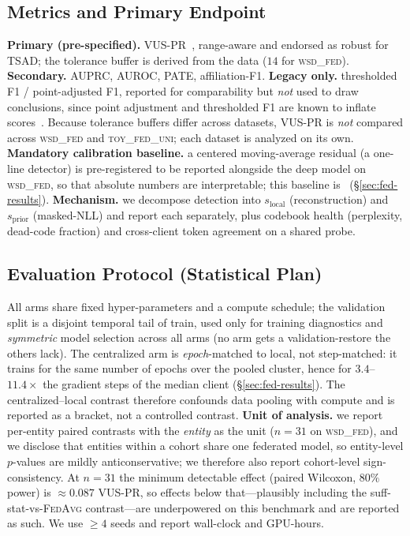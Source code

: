\subsection{Metrics and Primary Endpoint}
\label{sec:fed-metrics}
\textbf{Primary (pre-specified).} VUS-PR~\cite{boniol2022vus}, range-aware and endorsed as
robust for TSAD; the tolerance buffer is derived from the data ($14$ for \textsc{wsd\_fed}).
\textbf{Secondary.} AUPRC, AUROC, PATE, affiliation-F1. \textbf{Legacy only.} thresholded
F1 / point-adjusted F1, reported for comparability but \emph{not} used to draw conclusions,
since point adjustment and thresholded F1 are known to inflate scores~\cite{kim2022towards}.
Because tolerance buffers differ across datasets, VUS-PR is \emph{not} compared across
\textsc{wsd\_fed} and \textsc{toy\_fed\_uni}; each dataset is analyzed on its own.
\textbf{Mandatory calibration baseline.} a centered moving-average residual (a one-line
detector) is pre-registered to be reported alongside the deep model on \textsc{wsd\_fed}, so
that absolute numbers are interpretable; this baseline is \pending\ (\S\ref{sec:fed-results}).
\textbf{Mechanism.} we decompose detection into $s_{\mathrm{local}}$ (reconstruction) and
$s_{\mathrm{prior}}$ (masked-NLL) and report each separately, plus codebook health
(perplexity, dead-code fraction) and cross-client token agreement on a shared probe.

\subsection{Evaluation Protocol (Statistical Plan)}
\label{sec:fed-protocol}
All arms share fixed hyper-parameters and a compute schedule; the validation split is a
disjoint temporal tail of train, used only for training diagnostics and \emph{symmetric}
model selection across all arms (no arm gets a validation-restore the others lack). The
centralized arm is \emph{epoch}-matched to local, not step-matched: it trains for the same
number of epochs over the pooled cluster, hence for $3.4$--$11.4\times$ the gradient steps of
the median client (\S\ref{sec:fed-results}). The centralized--local contrast therefore
confounds data pooling with compute and is reported as a bracket, not a controlled contrast.
\textbf{Unit of analysis.} we report per-entity
paired contrasts with the \emph{entity} as the unit ($n{=}31$ on \textsc{wsd\_fed}), and we
disclose that entities within a cohort share one federated model, so entity-level
$p$-values are mildly anticonservative; we therefore also report cohort-level
sign-consistency. At $n{=}31$ the minimum detectable effect (paired Wilcoxon, $80\%$ power)
is $\approx 0.087$ VUS-PR, so effects below that---plausibly including the
suff-stat-vs-\textsc{FedAvg} contrast---are underpowered on this benchmark and are reported
as such. We use $\geq 4$ seeds and report wall-clock and GPU-hours.

